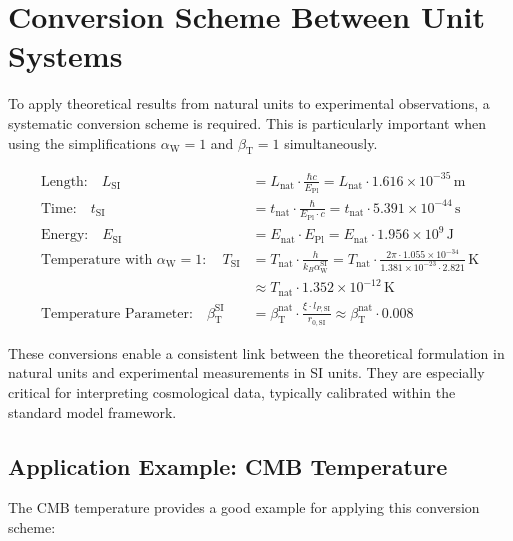 \documentclass[12pt,a4paper]{article}
\newcommand{\betaT}{\beta_{\text{T}}}
\newcommand{\alphaW}{\alpha_{\text{W}}}
\begin{document}
	\section{Conversion Scheme Between Unit Systems}
	
	To apply theoretical results from natural units to experimental observations, a systematic conversion scheme is required. This is particularly important when using the simplifications \(\alphaW = 1\) and \(\betaT = 1\) simultaneously.
	
	\begin{tcolorbox}[colback=blue!5!white,colframe=blue!75!black,title=Conversion Scheme Between Unit Systems]
		\begin{align}
			\text{Length:} \quad L_{\text{SI}} &= L_{\text{nat}} \cdot \frac{\hbar c}{E_{\text{Pl}}} = L_{\text{nat}} \cdot 1.616 \times 10^{-35} \, \text{m} \\
			\text{Time:} \quad t_{\text{SI}} &= t_{\text{nat}} \cdot \frac{\hbar}{E_{\text{Pl}} \cdot c} = t_{\text{nat}} \cdot 5.391 \times 10^{-44} \, \text{s} \\
			\text{Energy:} \quad E_{\text{SI}} &= E_{\text{nat}} \cdot E_{\text{Pl}} = E_{\text{nat}} \cdot 1.956 \times 10^9 \, \text{J} \\
			\text{Temperature with } \alphaW = 1: \quad T_{\text{SI}} &= T_{\text{nat}} \cdot \frac{h}{k_B \alphaW^{\text{SI}}} = T_{\text{nat}} \cdot \frac{2\pi \cdot 1.055 \times 10^{-34}}{1.381 \times 10^{-23} \cdot 2.821} \, \text{K} \\
			&\approx T_{\text{nat}} \cdot 1.352 \times 10^{-12} \, \text{K} \\
			\text{Temperature Parameter:} \quad \betaT^{\text{SI}} &= \betaT^{\text{nat}} \cdot \frac{\xi \cdot l_{P,\text{SI}}}{r_{0,\text{SI}}} \approx \betaT^{\text{nat}} \cdot 0.008
		\end{align}
	\end{tcolorbox}
	
	These conversions enable a consistent link between the theoretical formulation in natural units and experimental measurements in SI units. They are especially critical for interpreting cosmological data, typically calibrated within the standard model framework.
	
	\subsection{Application Example: CMB Temperature}
	
	The CMB temperature provides a good example for applying this conversion scheme:
	
\end{document}
